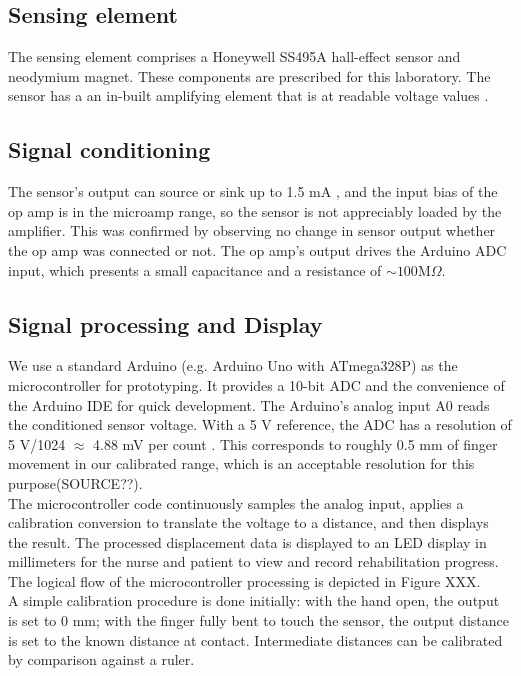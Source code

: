 \documentclass[a4paper,12pt]{article}
\begin{document}
\subsection{Sensing element}
The sensing element comprises a Honeywell SS495A hall-effect sensor \cite{ti_datasheet} and neodymium magnet. These components are prescribed for this laboratory. The sensor has a an in-built amplifying element that is at readable voltage values \cite{ti_datasheet}.

\subsection{Signal conditioning}
The sensor’s output can source or sink up to 1.5 mA  \cite{ti_datasheet}, and the input bias of the op amp is in the microamp range, so the sensor is not appreciably loaded by the amplifier. This was confirmed by observing no change in sensor output whether the op amp was connected or not. The op amp’s output drives the Arduino ADC input, which presents a small capacitance and a resistance of $\sim 100 \text{M} \Omega$.

\subsection{Signal processing and Display}
We use a standard Arduino (e.g. Arduino Uno with ATmega328P) as the microcontroller for prototyping. It provides a 10-bit ADC and the convenience of the Arduino IDE for quick development. The Arduino’s analog input A0 reads the conditioned sensor voltage. With a 5 V reference, the ADC has a resolution of 5 V/1024 $\approx$ 4.88 mV per count \cite{hu2025adc}. This corresponds to roughly 0.5 mm of finger movement in our calibrated range, which is an acceptable resolution for this purpose(SOURCE??).\\ 
The microcontroller code continuously samples the analog input, applies a calibration conversion to translate the voltage to a distance, and then displays the result. The processed displacement data is displayed to an LED display in millimeters for the nurse and patient to view and record rehabilitation progress. The logical flow of the microcontroller processing is depicted in Figure XXX.\\
A simple calibration procedure is done initially: with the hand open, the output is set to 0 mm; with the finger fully bent to touch the sensor, the output distance is set to the known distance at contact. Intermediate distances can be calibrated by comparison against a ruler. 
\end{document}
